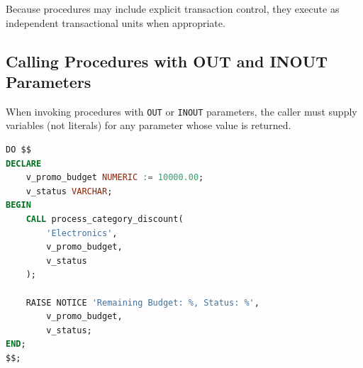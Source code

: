 \documentclass[12pt,a4paper]{article}
\begin{document}
Because procedures may include explicit transaction control, they execute as independent transactional units when appropriate.

\subsection{Calling Procedures with OUT and INOUT Parameters}

When invoking procedures with \texttt{OUT} or \texttt{INOUT} parameters, the caller must supply variables (not literals) for any parameter whose value is returned.

\begin{lstlisting}[language=SQL]
DO $$
DECLARE
    v_promo_budget NUMERIC := 10000.00;
    v_status VARCHAR;
BEGIN
    CALL process_category_discount(
        'Electronics',
        v_promo_budget,
        v_status
    );

    RAISE NOTICE 'Remaining Budget: %, Status: %',
        v_promo_budget,
        v_status;
END;
$$;
\end{lstlisting}

\newpage
\end{document}
